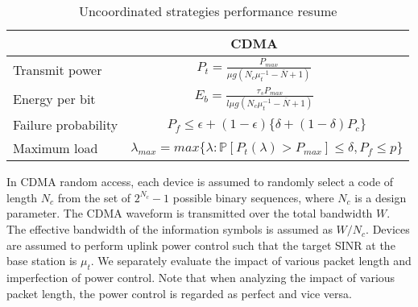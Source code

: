 \begin{table}[h]
	\centering
	\caption{Uncoordinated strategies performance resume}
	\label{tab:uncoordinated-resume}
	\begin{tabular}{@{}lcc@{}}
		\toprule
		& CDMA                                                                                                                                        \\ \midrule
		Transmit  power      & $P_t=\frac{P_{max}}{\mu g \left( N_c\mu_t^{-1} - \overline{N}+1\right)}$                         \\ \midrule
		Energy per bit      & $E_b=\frac{\tau_sP_{max}}{l\mu g \left( N_c\mu_t^{-1} - \overline{N}+1\right)}$ \\ \midrule
		Failure probability & \multicolumn{2}{c}{$P_f \leq \epsilon + (1-\epsilon)\{\delta+(1-\delta)P_c\}$}                                                                                  \\ \midrule
		Maximum load        & \multicolumn{2}{c}{$\lambda_{max} = max\{\lambda: \mathbb{P}\left[P_t(\lambda) > P_{max}\right] \leq \delta, P_f \leq p\}$}                                    \\ \bottomrule
	\end{tabular}
\end{table}
In CDMA random access, each device is assumed to randomly select a code of length $N_{c}$ from the set of $2^{N_{c}}-1$ possible binary sequences, where $N_c$ is a design parameter. The CDMA waveform is transmitted over the total bandwidth $W$. The effective bandwidth of the information symbols is assumed as $W/N_{c}$. Devices are assumed to perform uplink power control such that the target SINR at the base station is $\mu_{t}$. We separately evaluate the impact of various packet length and imperfection of power control. Note that when analyzing the impact of various packet length, the power control is regarded as perfect and vice versa.


